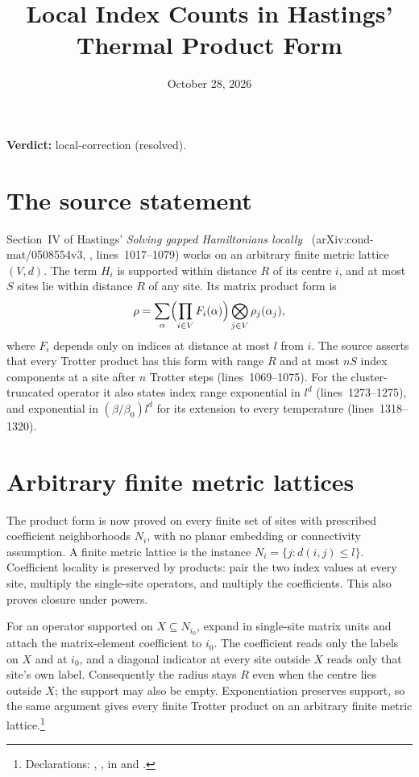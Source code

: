 \documentclass{article}
\title{Local Index Counts in Hastings' Thermal Product Form}
\author{}
\date{October 28, 2026}
\providecommand{\gapnote}[2]{\par\noindent\textbf{Verdict:} #1 (#2).\par}
\begin{document}
\maketitle
\gapnote{local-correction}{resolved}

\section{The source statement}

Section~IV of Hastings' \emph{Solving gapped Hamiltonians
locally}~\cite{Hastings2006Solving}
(arXiv:cond-mat/0508554v3, , lines~1017--1079)
works on an arbitrary finite metric lattice $(V,d)$. The term $H_i$ is
supported within distance $R$ of its centre $i$, and at most $S$ sites lie
within distance $R$ of any site. Its matrix product form is
\begin{align}
  \rho=\sum_{\alpha}\Bigl(\prod_{i\in V}F_i(\alpha)\Bigr)
          \bigotimes_{j\in V}\rho_j(\alpha_j),
  \label{eq:hastings05_product_metric_form}
\end{align}
where $F_i$ depends only on indices at distance at most $l$ from $i$.
The source asserts that every Trotter product has this form with range
$R$ and at most $nS$ index components at a site after $n$ Trotter steps
(lines~1069--1075). For the cluster-truncated operator it also states
index range exponential in $l^d$ (lines~1273--1275), and exponential in
$(\beta/\beta_0)l^d$ for its extension to every temperature
(lines~1318--1320).

\section{Arbitrary finite metric lattices}

The product form is now proved on every finite set of sites with prescribed
coefficient neighborhoods $N_i$, with no planar embedding or connectivity
assumption. A finite metric lattice is the instance
$N_i=\{j:d(i,j)\le l\}$. Coefficient locality is preserved by products:
pair the two index values at every site, multiply the single-site operators,
and multiply the coefficients. This also proves closure under powers.

For an operator supported on $X\subseteq N_{i_0}$, expand in single-site
matrix units and attach the matrix-element coefficient to $i_0$. The
coefficient reads only the labels on $X$ and at $i_0$, and a diagonal
indicator at every site outside $X$ reads only that site's own label.
Consequently the radius stays $R$ even when the centre lies outside $X$;
the support may also be empty. Exponentiation preserves support, so the
same argument gives every finite Trotter product on an arbitrary finite
metric lattice.\footnote{Declarations:
,
, in
 and .}
\end{document}
